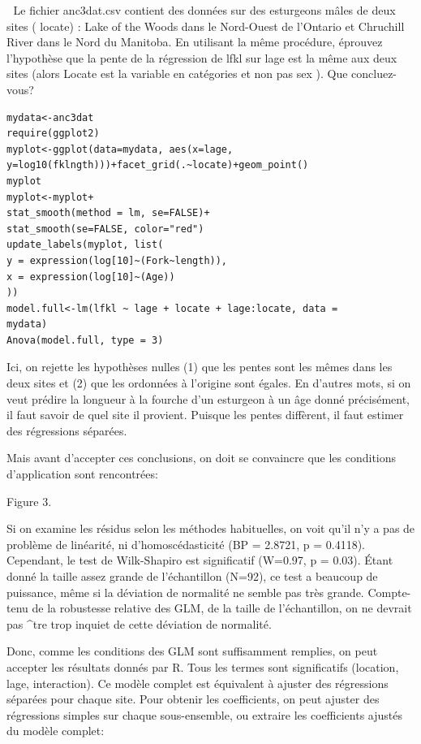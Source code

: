 \documentclass[12pt,]{book}
\begin{document}
 Le fichier anc3dat.csv contient des données sur des esturgeons
mâles de deux sites ( locate) : Lake of the Woods dans le Nord-Ouest
de l'Ontario et Chruchill River dans le Nord du Manitoba. En utilisant
la même procédure, éprouvez l'hypothèse que la pente de la régression
de lfkl sur lage est la même aux deux sites (alors Locate est la variable en catégories et non pas sex ). Que concluez-vous?

\begin{verbatim}
mydata<-anc3dat
require(ggplot2)
myplot<-ggplot(data=mydata, aes(x=lage,
y=log10(fklngth)))+facet_grid(.~locate)+geom_point()
myplot
myplot<-myplot+
stat_smooth(method = lm, se=FALSE)+
stat_smooth(se=FALSE, color="red")
update_labels(myplot, list(
y = expression(log[10]~(Fork~length)),
x = expression(log[10]~(Age))
))
model.full<-lm(lfkl ~ lage + locate + lage:locate, data =
mydata)
Anova(model.full, type = 3)
\end{verbatim}

Ici, on rejette les hypothèses nulles (1) que les pentes sont les mêmes
dans les deux sites et (2) que les ordonnées à l'origine sont égales. En
d'autres mots, si on veut prédire la longueur à la fourche d'un
esturgeon à un âge donné précisément, il faut savoir de quel site il
provient. Puisque les pentes diffèrent, il faut estimer des régressions
séparées.

Mais avant d'accepter ces conclusions, on doit se convaincre que les
conditions d'application sont rencontrées:

Figure 3.

Si on examine les résidus selon les méthodes habituelles, on voit qu'il
n'y a pas de problème de linéarité, ni d'homoscédasticité (BP =
2.8721, p = 0.4118). Cependant, le test de Wilk-Shapiro est significatif
(W=0.97, p = 0.03). Étant donné la taille assez grande de l'échantillon
(N=92), ce test a beaucoup de puissance, même si la déviation de
normalité ne semble pas très grande. Compte-tenu de la robustesse
relative des GLM, de la taille de l'échantillon, on ne devrait pas \^{}tre
trop inquiet de cette déviation de normalité.

Donc, comme les conditions des GLM sont suffisamment remplies,
on peut accepter les résultats donnés par R. Tous les termes sont
significatifs (location, lage, interaction). Ce modèle complet est
équivalent à ajuster des régressions séparées pour chaque site. Pour
obtenir les coefficients, on peut ajuster des régressions simples sur
chaque sous-ensemble, ou extraire les coefficients ajustés du modèle
complet:
\end{document}

